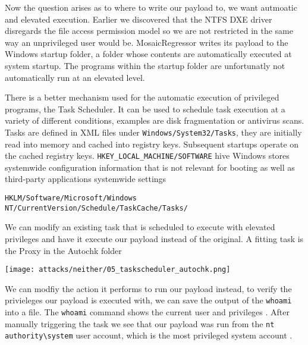 Now the question arises as to where to write our payload to, we want autmoatic and elevated execution. Earlier we discovered that the NTFS DXE driver disregards the file access permission model so we are not restricted in the same way an unprivileged user would be. MosaicRegressor writes its payload to the Windows startup folder, a folder whose contents are automatically executed at system startup. The programs within the startup folder are unfortunatly not automatically run at an elevated level.



There is a better mechanism used for the automatic execution of privileged programs, the Task Scheduler. It can be used to schedule task execution at a variety of different conditions, examples are disk fragmentation or antivirus scans.
Tasks are defined in XML files under \lstinline{Windows/System32/Tasks}, they are initially read into memory and cached into registry keys. Subsequent startups operate on the cached registry keys.
\lstinline{HKEY_LOCAL_MACHINE/SOFTWARE} hive
Windows stores systemwide configuration information that is not relevant for booting as well as third-party applications systemwide settings
\cite[10. The registry - Registry logical structure - HKEY_LOCAL_MACHINE]{windows-internals-7-part2}

\lstinline{HKLM/Software/Microsoft/Windows NT/CurrentVersion/Schedule/TaskCache/Tasks/}

\cite{windows-internals-7-part2}

We can modify an existing task that is scheduled to execute with elevated privileges and have it execute our payload instead of the original. A fitting task is the Proxy in the Autochk folder

\texttt{[image: attacks/neither/05\_taskscheduler\_autochk.png]}

We can modfiy the action it performs to run our payload instead, to verify the privieleges our payload is executed with, we can save the output of the \lstinline{whoami} into a file. The \lstinline{whoami} command shows the current user and privileges \cite{windows-whoami}. After manually triggering the task we see that our payload was run from the \lstinline{nt authority\system} user account, which is the most privileged system account \cite{microsoft-localsystem-account}.

